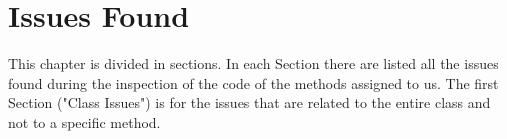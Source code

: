 \documentclass[../../codeInspection.tex]{subfiles}
\begin{document}
	\chapter{Issues Found}

		This chapter is divided in sections.
		In each Section there are listed all the issues found during the inspection of the code of the methods assigned to us. The first Section ("Class Issues") is for the issues that are related to the entire class and not to a specific method.

	

	

	

	

	

	
\end{document}
